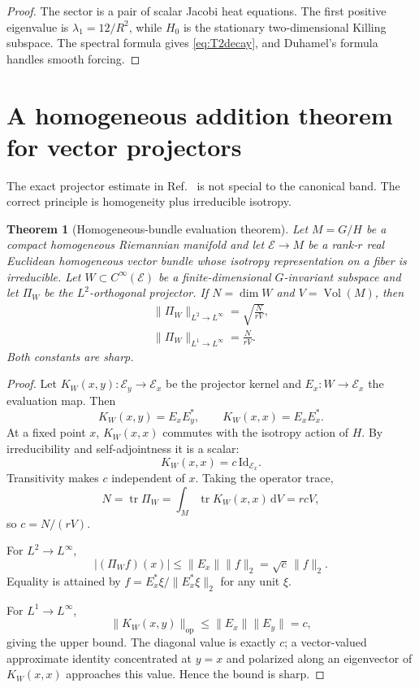 \documentclass[
 aps,
 prd,
 reprint,
 amsmath,
 amssymb,
 nofootinbib,
 superscriptaddress
]{revtex4-2}
\newtheorem{theorem}{Theorem}[section]
\theoremstyle{definition}
\theoremstyle{remark}
\newcommand{\Vol}{\operatorname{Vol}}
\newcommand{\dd}{\,\mathrm d}
\newcommand{\Id}{\mathrm{Id}}
\begin{document}
\begin{proof}
The sector is a pair of scalar Jacobi heat equations.  The first positive
eigenvalue is $\lambda_1=12/R^2$, while $H_0$ is the stationary
two-dimensional Killing subspace.  The spectral formula gives
\eqref{eq:T2decay}, and Duhamel's formula handles smooth forcing.
\end{proof}



\section{A homogeneous addition theorem for vector projectors}

The exact projector estimate in Ref.~\cite{PreeceBatenin2026} is not special to the
canonical band.  The correct principle is homogeneity plus irreducible
isotropy.

\begin{theorem}[Homogeneous-bundle evaluation theorem]
\label{thm:homogeneousprojector}
Let $M=G/H$ be a compact homogeneous Riemannian manifold and let
$\mathcal E\to M$ be a rank-$r$ real Euclidean homogeneous vector bundle
whose isotropy representation on a fiber is irreducible.  Let
$W\subset C^\infty(\mathcal E)$ be a finite-dimensional $G$-invariant
subspace and let $\Pi_W$ be the $L^2$-orthogonal projector.  If
$N=\dim W$ and $V=\Vol(M)$, then
\begin{align}
 \boxed{
 \|\Pi_W\|_{L^2\to L^\infty}
 =
 \sqrt{\frac{N}{rV}},
 }
 \label{eq:generalL2}\\
 \boxed{
 \|\Pi_W\|_{L^1\to L^\infty}
 =
 \frac{N}{rV}.
 }
 \label{eq:generalL1}
\end{align}
Both constants are sharp.
\end{theorem}

\begin{proof}
Let $K_W(x,y):\mathcal E_y\to\mathcal E_x$ be the projector kernel and
$E_x:W\to\mathcal E_x$ the evaluation map.  Then
\[
 K_W(x,y)=E_xE_y^*,
 \qquad
 K_W(x,x)=E_xE_x^*.
\]
At a fixed point $x$, $K_W(x,x)$ commutes with the isotropy action of $H$.
By irreducibility and self-adjointness it is a scalar:
\[
 K_W(x,x)=c\,\Id_{\mathcal E_x}.
\]
Transitivity makes $c$ independent of $x$.  Taking the operator trace,
\[
 N=\operatorname{tr}\Pi_W
 =\int_M\operatorname{tr}K_W(x,x)\dd V
 =rcV,
\]
so $c=N/(rV)$.

For $L^2\to L^\infty$,
\[
 |(\Pi_Wf)(x)|\le\|E_x\|\|f\|_2=\sqrt c\,\|f\|_2.
\]
Equality is attained by
$f=E_x^*\xi/\|E_x^*\xi\|_2$ for any unit $\xi$.

For $L^1\to L^\infty$,
\[
 \|K_W(x,y)\|_{\mathrm{op}}
 \le\|E_x\|\|E_y\|=c,
\]
giving the upper bound.  The diagonal value is exactly $c$; a vector-valued
approximate identity concentrated at $y=x$ and polarized along an eigenvector
of $K_W(x,x)$ approaches this value.  Hence the bound is sharp.
\end{proof}
\end{document}
